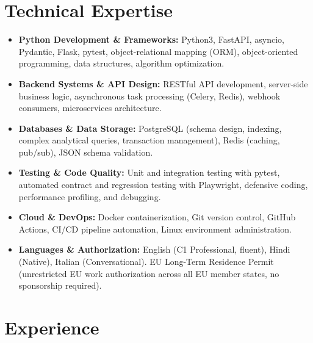 \documentclass[10pt,a4paper]{article}
\begin{document}
\section{Technical Expertise}
\begin{itemize}
  \item \textbf{Python Development \& Frameworks:} Python3, FastAPI, asyncio, Pydantic, Flask, pytest, object-relational mapping (ORM), object-oriented programming, data structures, algorithm optimization.
  \item \textbf{Backend Systems \& API Design:} RESTful API development, server-side business logic, asynchronous task processing (Celery, Redis), webhook consumers, microservices architecture.
  \item \textbf{Databases \& Data Storage:} PostgreSQL (schema design, indexing, complex analytical queries, transaction management), Redis (caching, pub/sub), JSON schema validation.
  \item \textbf{Testing \& Code Quality:} Unit and integration testing with pytest, automated contract and regression testing with Playwright, defensive coding, performance profiling, and debugging.
  \item \textbf{Cloud \& DevOps:} Docker containerization, Git version control, GitHub Actions, CI/CD pipeline automation, Linux environment administration.
  \item \textbf{Languages \& Authorization:} English (C1 Professional, fluent), Hindi (Native), Italian (Conversational). EU Long-Term Residence Permit (unrestricted EU work authorization across all EU member states, no sponsorship required).
\end{itemize}

\section{Experience}
\end{document}
